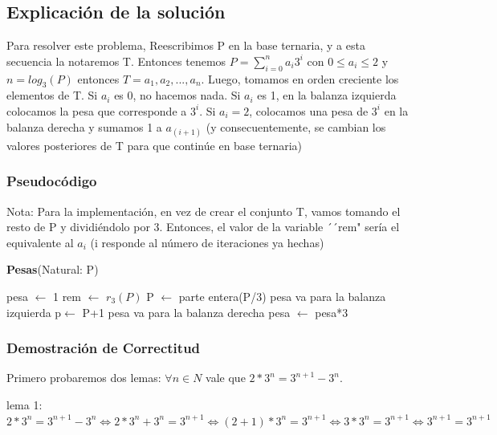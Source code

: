 \documentclass[spanish,12pt]{article}
\begin{document}
\subsection{Explicación de la solución}

Para resolver este problema, Reescribimos P en la base ternaria, y a esta secuencia la notaremos T. Entonces tenemos $P = \sum_{i=0}^{n} a_i3^i$  con $0 \leq a_i \leq 2$ y $n = log_{3}{(P)}$  entonces $T ={a_1,a_2,...,a_n}$.
Luego, tomamos en orden creciente los elementos de T. Si $a_i$ es 0, no hacemos nada. Si $a_i$ es 1, en la balanza izquierda colocamos la pesa que corresponde a $3^i$. Si $a_i =2$, colocamos una pesa de $3^i$ en la balanza derecha y sumamos 1 a $a_{(i+1)}$ (y consecuentemente, se cambian los valores posteriores de T para que continúe en base ternaria)


\subsubsection{Pseudocódigo}

Nota: Para la implementación, en vez de crear el conjunto T, vamos tomando el resto de P y dividiéndolo por 3. Entonces, el valor de la variable ´´rem" sería el equivalente al $a_i$ (i responde al número de iteraciones ya hechas)

\begin{algorithm}[H]{\textbf{Pesas}(Natural: P)}
	\begin{algorithmic}[1]
		\State pesa $\gets$ 1
		 	\State rem $\gets$ $r_3 (P)$
	    		\State P $\gets $ parte entera(P/3)
	    			\State pesa va para la balanza izquierda    			\Else
	    				\State p$\gets$ P+1
	    				\State pesa va para la balanza derecha
				\EndIf
			\EndIf
			\State pesa $\gets$ pesa*3
		\EndWhile
	\end{algorithmic}
\end{algorithm}



\subsubsection{Demostración de Correctitud}

Primero probaremos dos lemas:
$\forall n \in N$ vale que  $2*3^{n} = 3^{n+1}-3^{n}$.

lema 1:$ 2*3^{n} = 3^{n+1}-3^{n} \Longleftrightarrow 2*3^{n}+3^{n} = 3^{n+1} \Longleftrightarrow (2+1)*3^{n} = 3^{n+1} \Longleftrightarrow   3*3^{n} = 3^{n+1} \Longleftrightarrow  3^{n+1} = 3^{n+1}$ 
\end{document}
